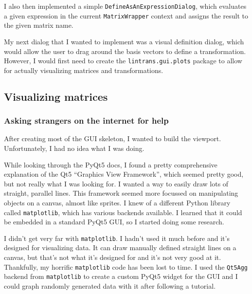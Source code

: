 \documentclass[../main.tex]{subfiles}
\begin{document}

I also then implemented a simple \texttt{DefineAsAnExpressionDialog}, which evaluates a given expression in the current \texttt{MatrixWrapper} context and assigns the result to the given matrix name.


My next dialog that I wanted to implement was a visual definition dialog, which would allow the user to drag around the basis vectors to define a transformation. However, I would first need to create the \texttt{lintrans.gui.plots} package to allow for actually visualizing matrices and transformations.

\subsection{Visualizing matrices\label{development:visualizing-matrices}}

\subsubsection{Asking strangers on the internet for help\label{development:visualizing-matrices:asking-strangers-on-the-internet-for-help}}

After creating most of the GUI skeleton, I wanted to build the viewport. Unfortunately, I had no idea what I was doing.

While looking through the PyQt5 docs, I found a pretty comprehensive explanation of the Qt5 \enquote{Graphics View Framework}\cite{pyqt5-graphics-view-framework}, which seemed pretty good, but not really what I was looking for. I wanted a way to easily draw lots of straight, parallel lines. This framework seemed more focussed on manipulating objects on a canvas, almost like sprites. I knew of a different Python library called \texttt{matplotlib}, which has various backends available. I learned that it could be embedded in a standard PyQt5 GUI, so I started doing some research.

I didn't get very far with \texttt{matplotlib}. I hadn't used it much before and it's designed for visualizing data. It can draw manually defined straight lines on a canvas, but that's not what it's designed for and it's not very good at it. Thankfully, my horrific \texttt{matplotlib} code has been lost to time. I used the \texttt{Qt5Agg} backend from \texttt{matplotlib} to create a custom PyQt5 widget for the GUI and I could graph randomly generated data with it after following a tutorial\cite{matplotlib-pyqt5-tutorial}.
\end{document}
